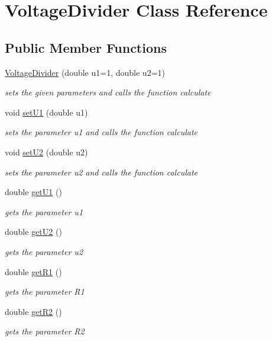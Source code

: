 \hypertarget{classVoltageDivider}{}\section{Voltage\+Divider Class Reference}
\label{classVoltageDivider}
\subsection*{Public Member Functions}
\begin{DoxyCompactItemize}
\item 
\hyperlink{classVoltageDivider_a7e71609cdfe3faa54ddfde5c7634a92c}{Voltage\+Divider} (double u1=1, double u2=1)
\begin{DoxyCompactList}\small\item\em sets the given parameters and calls the function calculate \end{DoxyCompactList}\item 
void \hyperlink{classVoltageDivider_aecff4be4ac8dbe9dbee07f57a15cc370}{set\+U1} (double u1)
\begin{DoxyCompactList}\small\item\em sets the parameter u1 and calls the function calculate \end{DoxyCompactList}\item 
void \hyperlink{classVoltageDivider_a52270fd71980ed94bc64e7a6f65a9e5c}{set\+U2} (double u2)
\begin{DoxyCompactList}\small\item\em sets the parameter u2 and calls the function calculate \end{DoxyCompactList}\item 
double \hyperlink{classVoltageDivider_a36ab249dd0f1e5cb7b055affd249af6c}{get\+U1} ()
\begin{DoxyCompactList}\small\item\em gets the parameter u1 \end{DoxyCompactList}\item 
double \hyperlink{classVoltageDivider_aee0957fabf473c72488e3d5fa7316bcd}{get\+U2} ()
\begin{DoxyCompactList}\small\item\em gets the parameter u2 \end{DoxyCompactList}\item 
double \hyperlink{classVoltageDivider_ac9928564fe59e40e12346222a7eb82a2}{get\+R1} ()
\begin{DoxyCompactList}\small\item\em gets the parameter R1 \end{DoxyCompactList}\item 
double \hyperlink{classVoltageDivider_aa83138c075ea0b37a20d65e4d7cc068b}{get\+R2} ()
\begin{DoxyCompactList}\small\item\em gets the parameter R2 \end{DoxyCompactList}\end{DoxyCompactItemize}


